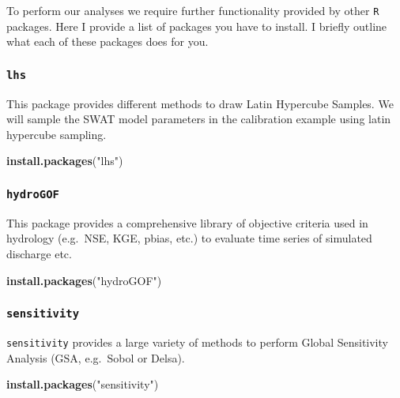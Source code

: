 \documentclass[11pt,]{article}
\newenvironment{Shaded}{\begin{snugshade}}{\end{snugshade}}
\newcommand{\KeywordTok}[1]{\textcolor[rgb]{0.13,0.29,0.53}{\textbf{#1}}}
\newcommand{\StringTok}[1]{\textcolor[rgb]{0.31,0.60,0.02}{#1}}
\newcommand{\NormalTok}[1]{#1}
\begin{document}
To perform our analyses we require further functionality provided by
other \texttt{R} packages. Here I provide a list of packages you have to
install. I briefly outline what each of these packages does for you.

\subsubsection{\texorpdfstring{\texttt{lhs}}{lhs}}\label{lhs}

This package provides different methods to draw Latin Hypercube Samples.
We will sample the SWAT model parameters in the calibration example
using latin hypercube sampling.

\begin{Shaded}
\begin{Highlighting}[]
\KeywordTok{install.packages}\NormalTok{(}\StringTok{"lhs"}\NormalTok{)}
\end{Highlighting}
\end{Shaded}

\subsubsection{\texorpdfstring{\texttt{hydroGOF}}{hydroGOF}}\label{hydrogof}

This package provides a comprehensive library of objective criteria used
in hydrology (e.g.~NSE, KGE, pbias, etc.) to evaluate time series of
simulated discharge etc.

\begin{Shaded}
\begin{Highlighting}[]
\KeywordTok{install.packages}\NormalTok{(}\StringTok{"hydroGOF"}\NormalTok{)}
\end{Highlighting}
\end{Shaded}

\subsubsection{\texorpdfstring{\texttt{sensitivity}}{sensitivity}}\label{sensitivity}

\texttt{sensitivity} provides a large variety of methods to perform
Global Sensitivity Analysis (GSA, e.g.~Sobol or Delsa).

\begin{Shaded}
\begin{Highlighting}[]
\KeywordTok{install.packages}\NormalTok{(}\StringTok{"sensitivity"}\NormalTok{)}
\end{Highlighting}
\end{Shaded}
\end{document}
